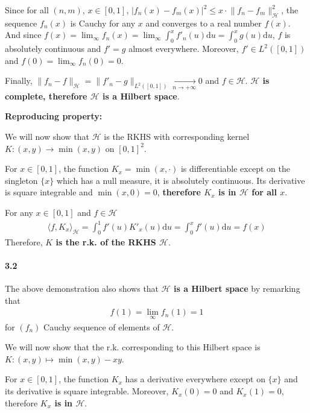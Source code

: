 \documentclass[10pt]{article}
\begin{document}
    Since for all $(n,m)$, $x \in [0, 1]$, 
    $|f_n(x) - f_m(x)|^2\leq x \cdot \lVert f_n - f_m \rVert_\mathcal{H}^2$, the
    sequence $f_n(x)$ is Cauchy for any $x$ and converges to a real number 
    $f(x)$. 
    And since $f(x) = \lim_\infty f_n(x) = \lim_\infty \int_0^xf'_n(u)\text{d}u
    =  \int_0^x g(u)\text{d}u$, $f$ is absolutely continuous and $f' = g$ almost
    everywhere. Moreover, $f'\in L^2([0, 1])$ and $f(0) = \lim_\infty f_n(0) 
    = 0$. 
     
    Finally, $\lVert f_n - f \rVert_\mathcal{H} = \lVert f'_n - g 
    \rVert_{L^2([0,1])} \xrightarrow[n \rightarrow +\infty]{} 0$ and $f\in 
    \mathcal{H}$. \textbf{$\mathcal{H}$ is complete, therefore $\mathcal{H}$ is 
    a Hilbert space}.
    \vspace{1cm}

    \textbf{Reproducing property: }

    We will now show that $\mathcal{H}$ is the RKHS with corresponding kernel 
    $K: (x, y) \rightarrow \min(x, y)$ on $[0, 1]^2$.

    For $x\in [0, 1]$, the function $K_x = \min(x,\cdot)$ is differentiable 
    except on the singleton $\{x\}$ which has a null measure, it is absolutely 
    continuous. Its derivative is square integrable and $\min(x,0) = 0$, 
    \textbf{therefore $K_x$ is in $\mathcal{H}$ for all $x$}.

    For any $x\in [0, 1]$ and $f \in \mathcal{H}$
    \begin{align*}
        \langle f, K_x \rangle_\mathcal{H} = \int_0^1 f'(u)K'_x(u)\text{d}u = 
        \int_0^x f'(u)\text{d}u = f(x)
    \end{align*}
    Therefore, \textbf{$K$ is the r.k. of the RKHS $\mathcal{H}$}.

    \paragraph{3.2} The above demonstration also shows that 
    \textbf{$\mathcal{H}$ is a Hilbert space} by remarking that 
    \begin{align*}
        f(1) = \lim_\infty f_n(1) = 1
    \end{align*} for $(f_n)$ Cauchy sequence of elements of 
    $\mathcal{H}$.
    
    We will now show that the r.k. corresponding to this Hilbert space is $K: 
    (x, y) \mapsto \min(x,y) - xy$. 

    For $x\in[0, 1]$, the function $K_x$ has a derivative everywhere except on 
    $\{x\}$ and its derivative is square integrable. Moreover, $K_x(0) = 0$ and 
    $K_x(1) = 0 $, therefore \textbf{$K_x$ is in $\mathcal{H}$}.
\end{document}
